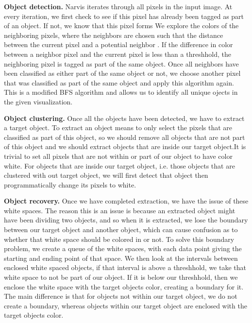 \textbf{Object detection.} Narvis iterates through all pixels in the input image. At every iteration, we first check to see if this pixel has already been tagged as part of an object. If not, we know that this pixel forms  We explore the colors of the neighboring pixels, where the neighbors are chosen such that the distance between the current pixel and a potential neighbor . If the difference in color between a neighbor pixel and the current pixel is less than a threshhold, the neighboring pixel is tagged as part of the same object. Once all neighbors have been classified as either part of the same object or not, we choose another pixel that was classified as part of the same object and apply this algorithm again. This is a modified BFS algorithm and allows us to identify all unique ojects in the given visualization.

\textbf{Object clustering.} Once all the objects have been detected, we have to extract a target object. To extract an object means to only select the pixels that are classified as part of this object, so we should remove all objects that are not part of this object and we should extract objects that are inside our target object.It is trivial to set all pixels that are not within or part of our object to have color white. For objects that are inside our target object, i.e. those objects that are clustered with out target object, we will first detect that object then programmatically change its pixels to white.

\textbf{Object recovery.} Once we have completed extraction, we have the issue of these white spaces. The reason this is an issue is because an extracted object might have been dividing two objects, and so when it is extracted, we lose the boundary between our target object and another object, which can cause confusion as to whether that white space should be colored in or not. To solve this boundary problem, we create a queue of the white spaces, with each data point giving the starting and ending point of that space. We then look at the intervals between enclosed white spaced objects, if that interval is above a threshhold, we take that white space to not be part of our object. If it is below our threshhold, then we enclose the white space with the target objects color, creating a boundary for it. The main difference is that for objects not within our target object, we do not create a boundary, whereas objects within our target object are enclosed with the target objects color.

